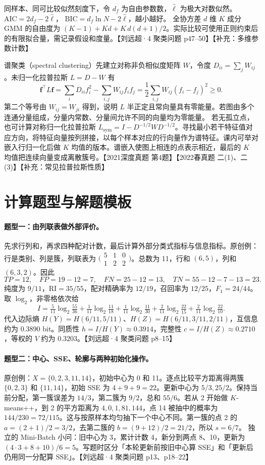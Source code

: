 \documentclass[UTF8,a4paper,zihao=-4,fontset=fandol]{ctexrep}
\begin{document}
同样本、同可比较似然刻度下，令 $d_f$ 为自由参数数，$\hat\ell$ 为极大对数似然。
$\mathrm{AIC}=2d_f-2\hat\ell$，
$\mathrm{BIC}=d_f\ln N-2\hat\ell$，越小越好。
全协方差 $d$ 维 $K$ 成分 GMM 的自由度为 $(K-1)+Kd+K\,d(d+1)/2$。实际比较可使用正则约束后的有限拟合量，需记录假设和度量。【刘远超·4 聚类问题 p47–50】【补充：多维参数计数】

谱聚类（spectral clustering）先建立对称非负相似度矩阵 $W$，令度 $D_{ii}=\sum_jW_{ij}$。未归一化拉普拉斯 $L=D-W$ 有
\[
\bm f^\top L\bm f
=\sum_iD_{ii}f_i^2-\sum_{i,j}W_{ij}f_if_j
=\frac12\sum_{i,j}W_{ij}(f_i-f_j)^2\ge0.
\]
第二个等号由 $W_{ij}=W_{ji}$ 得到，说明 $L$ 半正定且常向量具有零能量。若图由多个连通分量组成，分量内常数、分量间允许不同的向量均为零能量。
若无孤立点，也可计算对称归一化拉普拉斯 $L_{\mathrm{sym}}=I-D^{-1/2}WD^{-1/2}$。寻找最小若干特征值对应方向，将特征向量按列拼接，以每个样本对应的行向量作为谱特征。课内可举对嵌入行归一化后做 $K$ 均值的版本。谱嵌入使图上相连的点表示相近，最后的 $K$ 均值把连续向量变成离散簇号。【2021深度真题 第4题】【2022春真题 二(1)、二(3)】【补充：常见拉普拉斯性质】

\section{计算题型与解题模板}

\paragraph{题型一：由列联表做外部评价。}
先求行列和，再求四种配对计数，最后计算外部分类式指标与信息指标。原创例：行是类别、列是簇，列联表为
$\bigl(\begin{smallmatrix}5&1&0\\1&2&2\end{smallmatrix}\bigr)$。总数为 11，行和 $(6,5)$，列和 $(6,3,2)$。因此
\[
TP=12,\quad FP=19-12=7,\quad FN=25-12=13,\quad TN=55-12-7-13=23.
\]
纯度为 $9/11$，$\mathrm{RI}=35/55$，配对精确率为 $12/19$，召回率为 $12/25$，$F_1=24/44$。
取 $\log_2$，非零格依次给
\[
I=\tfrac5{11}\log_2\tfrac{55}{36}+\tfrac1{11}\log_2\tfrac{11}{18}
 +\tfrac1{11}\log_2\tfrac{11}{30}+\tfrac2{11}\log_2\tfrac{22}{15}
 +\tfrac2{11}\log_2\tfrac{22}{10}.
\]
代入边际熵 $H(Y)=H(6/11,5/11)$、$H(Z)=H(6/11,3/11,2/11)$，互信息约为 $0.3890$ bit。同质性 $h=I/H(Y)\approx0.3914$，完整性 $c=I/H(Z)\approx0.2710$，等权的 $V$ 约为 $0.3203$。【刘远超·4 聚类问题 p8–15】

\paragraph{题型二：中心、SSE、轮廓与两种初始化操作。}
原创例：$X=\{0,2,3,11,14\}$，初始中心为 0 和 11。逐点比较平方距离得两簇 $\{0,2,3\}$ 和 $\{11,14\}$，初始 SSE 为 $4+9+9=22$。更新中心为 $5/3,25/2$。保持当前分配，第一簇误差为 $14/3$，第二簇为 $9/2$，总和 $55/6$。若从 2 开始做 $K$-means++，到 2 的平方距离为 $4,0,1,81,144$，点 14 被抽中的概率为 $144/230=72/115$。这与按原样本均匀抽下一个中心不同。第一簇的点 2 的 $a=(2+1)/2=3/2$，去第二簇的 $b=(9+12)/2=21/2$，所以 $s=6/7$。
独立的 Mini-Batch 小问：旧中心为 3，累计计数 4，新分到两点 8、10，更新为 $(4\cdot3+8+10)/6=5$。写题时区分「本轮更新前按旧中心算 SSE」和「更新后仍用同一分配算 SSE」。【刘远超·4 聚类问题 p13、p18–22】
\end{document}
